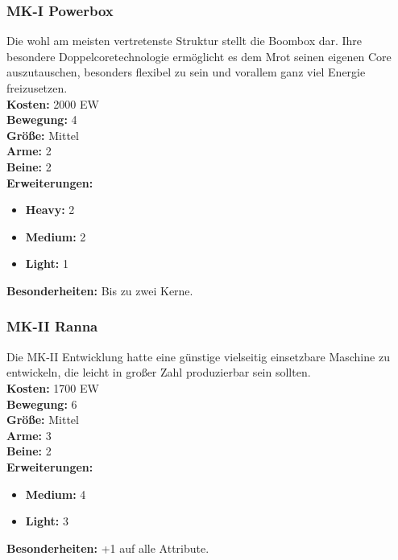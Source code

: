 \subsubsection*{MK-I Powerbox}
Die wohl am meisten vertretenste Struktur stellt die Boombox dar. Ihre besondere Doppelcoretechnologie ermöglicht es dem Mrot seinen eigenen Core auszutauschen, besonders flexibel zu sein und vorallem ganz viel Energie freizusetzen.\\
\textbf{Kosten:} 2000 EW\\
\textbf{Bewegung:} 4 \\
\textbf{Größe:} Mittel \\
\textbf{Arme:} 2 \\
\textbf{Beine:} 2 \\
\textbf{Erweiterungen:} \begin{itemize}
	    \item \textbf{Heavy:} 2
	    \item \textbf{Medium:} 2
	    \item \textbf{Light:} 1 \end{itemize}
\textbf{Besonderheiten:} Bis zu zwei Kerne.

\subsubsection*{MK-II Ranna}
Die MK-II Entwicklung hatte eine günstige vielseitig einsetzbare Maschine zu entwickeln, die leicht in großer Zahl produzierbar sein sollten.\\
\textbf{Kosten:} 1700 EW\\
\textbf{Bewegung:} 6 \\
\textbf{Größe:} Mittel \\
\textbf{Arme:} 3 \\
\textbf{Beine:} 2 \\
\textbf{Erweiterungen:} \begin{itemize}
	    \item \textbf{Medium:} 4
	    \item \textbf{Light:} 3 \end{itemize}
\textbf{Besonderheiten:} +1 auf alle Attribute.

